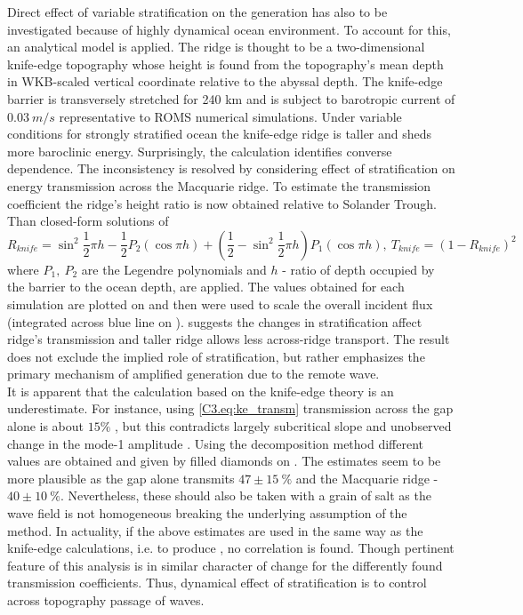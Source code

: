 \documentclass[12pt]{article}
\begin{document}
Direct effect of variable stratification on the generation has also to be investigated because of 
highly dynamical ocean environment. To account for this, an analytical model 
\citep{st2003generation} is 
applied. The 
ridge is thought to be a two-dimensional knife-edge 
topography whose height is found from the topography's mean depth in WKB-scaled vertical coordinate 
\citep{althaus2003internal} relative to the abyssal depth. The knife-edge barrier is transversely 
stretched for 240 km and is subject to barotropic current of $0.03~m/s$ representative to ROMS 
numerical simulations. Under variable conditions for strongly stratified ocean the knife-edge ridge 
is taller and sheds more baroclinic energy. Surprisingly, the calculation 
 identifies converse dependence. The inconsistency is 
resolved by considering effect of stratification on energy transmission across the Macquarie ridge. 
To estimate the transmission coefficient the ridge's height ratio is now obtained relative to 
Solander Trough. Than closed-form solutions of \citep{larsen1969internal} 
\begin{equation}
\label{C3.eq:ke_transm}
R_{knife} = \sin^2 \frac{1}{2} \pi h - \frac{1}{2} P_2( \cos \pi h ) + (\frac{1}{2} - \sin^2 
\frac{1}{2} \pi h) P_1( \cos \pi h ),~
T_{knife} = (1 - R_{knife})^2
\end{equation}
where $P_1,~P_2$ are the Legendre polynomials and $h$ - ratio of depth occupied by the barrier to 
the ocean depth, are applied. The values obtained for each simulation are plotted on 
 and then were used to scale the overall 
incident flux 
(integrated across blue line on ).  
suggests the changes in stratification affect ridge's transmission and taller ridge allows less 
across-ridge transport. The result does not exclude the implied role of stratification, but rather 
emphasizes the primary mechanism of amplified generation due to the remote wave.\\

It is apparent that the calculation based on the knife-edge theory is an underestimate. For 
instance, using \eqref{C3.eq:ke_transm} transmission across the gap alone is 
about $15\%$ , but this contradicts largely subcritical 
slope and unobserved change in the mode-1 amplitude . Using the 
decomposition method different values are obtained and given by filled diamonds on 
. The estimates seem to be more plausible as the gap alone 
transmits $47 \pm 15~\%$ and the Macquarie ridge - $40 \pm 10~\%$. Nevertheless, these should also 
be taken with a grain of salt as the wave field is not homogeneous breaking the 
underlying assumption of the method. In actuality, if the above estimates are used in the same way 
as the knife-edge calculations, i.e. to produce , no correlation is 
found. Though pertinent feature of this analysis is in similar character of change for the 
differently found transmission coefficients. Thus, dynamical effect of stratification is to control 
across topography passage of waves.\\
\end{document}
